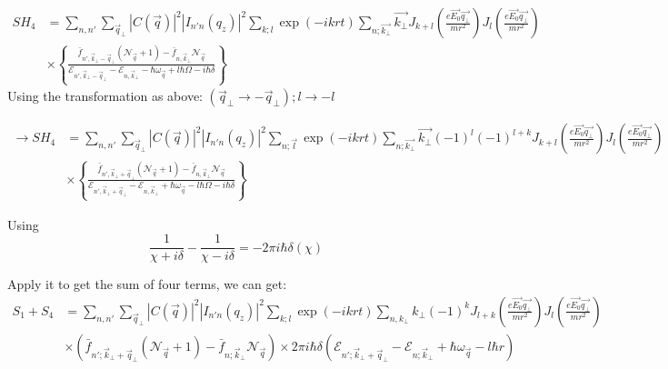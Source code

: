 \documentclass{article}
\begin{document}
\begin{align*}
    SH_4 &= \sum_{n,n'} \sum_{\vec{q}_{\bot}} |C(\vec{q})|^2 |I_{n'n}(q_z)|^2 \sum_{k;l} \exp(-i k r t) \sum_{n;\vec{k_\bot}}\vec{k_\bot} J_{k+l} \left( \frac{e \vec{E_0} \vec{q_\bot}}{m r^2} \right) J_{l} \left( \frac{e \vec{E_0} \vec{q_\bot}}{m r^2} \right)\\&\times \left\{ \frac{\bar{f}_{n', \vec{k}_{\bot}-\vec{q}_{\bot}} (\mathcal{N}_{\vec{q}} + 1) - \bar{f}_{n, \vec{k}_{\bot}} \mathcal{N}_{\vec{q}}}{\mathcal{E}_{n', \vec{k}_{\bot}-\vec{q}_{\bot}} - \mathcal{E}_{n, \vec{k}_{\bot}} - \hbar \omega_{\vec{q}} + l \hbar \Omega - i \hbar \delta} \right\}
\end{align*}
Using the transformation as above: $(\vec{q}_{\bot} \rightarrow -\vec{q}_{\bot}) ; l \rightarrow -l$

\begin{align*}
    \to SH_4 &= \sum_{n,n'} \sum_{\vec{q}_{\bot}} |C(\vec{q})|^2 |I_{n'n}(q_z)|^2 \sum_{n;\vec{l}} \exp(-i k r t) \sum_{n;\vec{k_\bot}}\vec{k_\bot} (-1)^l (-1)^{l+k} J_{k+l} \left( \frac{e \vec{E_0} \vec{q_\bot}}{m r^2} \right) J_{l} \left( \frac{e \vec{E_0} \vec{q_\bot}}{m r^2} \right)\\
    &\times \left\{ \frac{\bar{f}_{n', \vec{k}_{\bot}+\vec{q}_{\bot}} (\mathcal{N}_{\vec{q}} + 1) - \bar{f}_{n, \vec{k}_{\bot}} \mathcal{N}_{\vec{q}}}{\mathcal{E}_{n', \vec{k}_{\bot}+\vec{q}_{\bot}} - \mathcal{E}_{n, \vec{k}_{\bot}} + \hbar \omega_{\vec{q}} - l \hbar \Omega - i \hbar \delta} \right\}
\end{align*}

Using $$\frac{1}{\chi + i \delta}-\frac{1}{\chi - i \delta} = -2\pi i \hbar\delta(\chi)$$ 


Apply it to get the sum of four terms, we can get:
\begin{align*}
    S_1 + S_4 &= \sum_{n,n'} \sum_{\vec{q}_{\bot}} |C(\vec{q})|^2 |I_{n'n}(q_z)|^2 \sum_{k;l} \exp(-i k r t) \sum_{n,k_{\bot}} k_\bot (-1)^{k} J_{l+k} \left( \frac{e \vec{E_0} \vec{q_\bot}}{m r^2} \right) J_{l} \left( \frac{e \vec{E_0} \vec{q_{\bot}}}{m r^2} \right) \\
    &\times \left( \bar{f}_{n'; \vec{k}_{\bot}+\vec{q}_{\bot}} (\mathcal{N}_{\vec{q}} + 1) - \bar{f}_{n; \vec{k}_{\bot}} \mathcal{N}_{\vec{q}} \right) \times 2\pi i \hbar \delta \left( \mathcal{E}_{n'; \vec{k}_{\bot}+\vec{q}_{\bot}} - \mathcal{E}_{n; \vec{k}_{\bot}} + \hbar \omega_{\vec{q}} - l \hbar r\right)
\end{align*}
\end{document}
